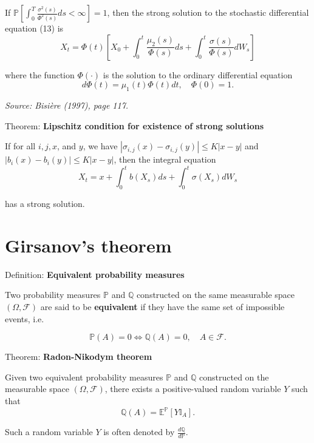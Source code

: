 \documentclass[12pt,a4paper]{article}
\begin{document}
If $\mathbb{P} \left[\int_0^T \frac{\sigma^2(s)}{\Phi^2(s)} ds < \infty\right] = 1$, then the strong solution to the stochastic differential equation (13) is
\[
X_t = \Phi(t) \left[X_0 + \int_0^t \frac{\mu_2(s)}{\Phi(s)} ds + \int_0^t \frac{\sigma(s)}{\Phi(s)} dW_s\right]
\]

where the function $\Phi(\cdot)$ is the solution to the ordinary differential equation
\[
d\Phi(t) = \mu_1(t) \Phi(t) dt, \quad \Phi(0) = 1.
\]

\textit{Source: Bisière (1997), page 117.}

\vspace{1em}

Theorem: \textbf{Lipschitz condition for existence of strong solutions}
\vspace{0.5em}

If for all $i, j, x$, and $y$, we have $|\sigma_{i,j}(x) - \sigma_{i,j}(y)| \leq K|x - y|$ and $|b_i(x) - b_i(y)| \leq K|x - y|$, then the integral equation
\[
X_t = x + \int_0^t b(X_s) ds + \int_0^t \sigma(X_s) dW_s
\]

has a strong solution.


\vspace{1em}


\section{Girsanov's theorem}

Definition: \textbf{Equivalent probability measures}
\vspace{0.5em}

Two probability measures $\mathbb{P}$ and $\mathbb{Q}$ constructed on the same measurable space $(\Omega, \mathcal{F})$ are said to be \textbf{equivalent} if they have the same set of impossible events, i.e.

\[
\mathbb{P}(A) = 0 \Leftrightarrow \mathbb{Q}(A) = 0, \quad A \in \mathcal{F}.
\]

\vspace{1em}

Theorem: \textbf{Radon-Nikodym theorem}
\vspace{0.5em}

Given two equivalent probability measures $\mathbb{P}$ and $\mathbb{Q}$ constructed on the measurable space $(\Omega, \mathcal{F})$, there exists a positive-valued random variable $Y$ such that
\[
\mathbb{Q}(A) = \mathbb{E}^{\mathbb{P}}[Y\mathbb{I}_A].
\]

Such a random variable $Y$ is often denoted by $\frac{d\mathbb{Q}}{d\mathbb{P}}$.
\end{document}
